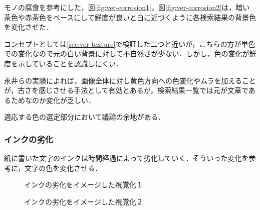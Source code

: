 モノの腐食を参考にした，図\ref{fig:ver-corrosion1}，図\ref{fig:ver-corrosion2}は，暗い茶色や赤茶色をベースにして鮮度が良いと白に近づくように各検索結果の背景色を変化させた．

コンセプトとしては\ref{sec:ver-texture}で検証した二つと近いが，こちらの方が単色での変化なので元の白い背景に対して不自然さが少ない．しかし，色の変化が鮮度を示していることを認識しにくい．

永井らの実験によれば，画像全体に対し黄色方向への色変化やムラを加えることが，古さを感じさせる手法として有効\cite{fading}とあるが，検索結果一覧では元が文章であるためなのか変化が乏しい．

適応する色の選定部分において議論の余地がある．

\subsubsection{インクの劣化}
\label{subsec:ver-col-ink}

紙に書いた文字のインクは時間経過によって劣化していく．そういった変化を参考に，文字の色を変化させる．

\begin{figure}[htbp]
  \begin{minipage}{0.5\hsize}
    \begin{center}
    \end{center}
    \caption{インクの劣化をイメージした視覚化１}
    \label{fig:ver-ink1}
  \end{minipage}
  \begin{minipage}{0.5\hsize}
    \begin{center}
    \end{center}
    \caption{インクの劣化をイメージした視覚化２}
    \label{fig:ver-ink2}
  \end{minipage}
\end{figure}

